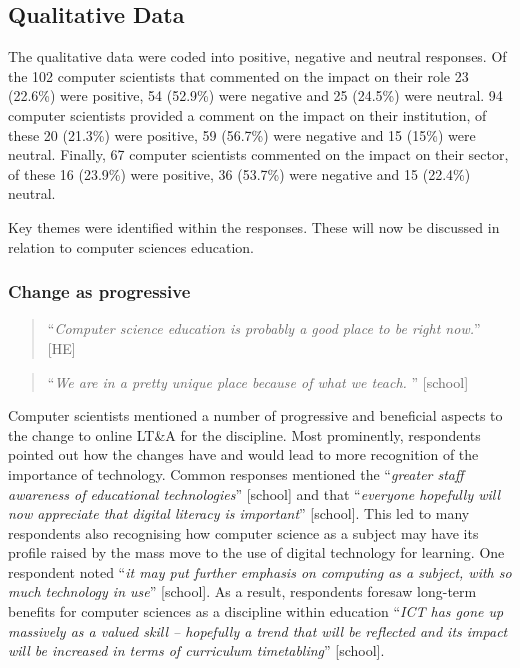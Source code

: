 \documentclass[sigconf]{acmart}
\begin{document}
\subsection{Qualitative Data}\label{qualdata}

The qualitative data were coded into positive, negative and neutral
responses. Of the 102 computer scientists that commented on the impact
on their role 23 (22.6\%) were positive, 54 (52.9\%) were negative and
25 (24.5\%) were neutral.  94 computer scientists provided a comment
on the impact on their institution, of these 20 (21.3\%) were
positive, 59 (56.7\%) were negative and 15 (15\%) were
neutral. Finally, 67 computer scientists commented on the impact on
their sector, of these 16 (23.9\%) were positive, 36 (53.7\%) were
negative and 15 (22.4\%) neutral.

Key themes were identified within the responses. These will now be
discussed in relation to computer sciences education.

\subsubsection{Change as progressive}

\begin{quotation}
``{\emph{Computer science education is probably a good place to be
right now.}}'' [HE]
\end{quotation}

\begin{quotation}
``{\emph{We are in a pretty unique place because of what we
teach. }}'' [school]
\end{quotation}

Computer scientists mentioned a number of progressive and beneficial
aspects to the change to online LT\&A for the discipline. Most
prominently, respondents pointed out how the changes have and would
lead to more recognition of the importance of technology. Common
responses mentioned the ``{\emph{greater staff awareness of
educational technologies}}” [school] and that ``{\emph{everyone
hopefully will now appreciate that digital literacy is important}}''
[school]. This led to many respondents also recognising how computer
science as a subject may have its profile raised by the mass move to
the use of digital technology for learning. One respondent noted
``{\emph{it may put further emphasis on computing as a subject, with
so much technology in use}}'' [school]. As a result, respondents
foresaw long-term benefits for computer sciences as a discipline
within education ``{\emph{ICT has gone up massively as a valued skill
-- hopefully a trend that will be reflected and its impact will be
increased in terms of curriculum timetabling}}'' [school].
\end{document}
